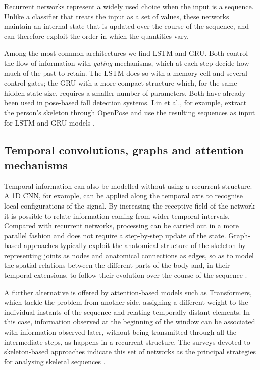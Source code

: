 Recurrent networks represent a widely used choice when the input is a sequence. Unlike a classifier that treats the input as a set of values, these networks maintain an internal state that is updated over the course of the sequence, and can therefore exploit the order in which the quantities vary.

Among the most common architectures we find LSTM and GRU. Both control the flow of information with \emph{gating} mechanisms, which at each step decide how much of the past to retain. The LSTM does so with a memory cell and several control gates; the GRU with a more compact structure which, for the same hidden state size, requires a smaller number of parameters. Both have already been used in pose-based fall detection systems. Lin et al., for example, extract the person's skeleton through OpenPose and use the resulting sequences as input for LSTM and GRU models \cite{LN}.

\subsection{Temporal convolutions, graphs and attention mechanisms}

Temporal information can also be modelled without using a recurrent structure. A 1D CNN, for example, can be applied along the temporal axis to recognise local configurations of the signal. By increasing the receptive field of the network it is possible to relate information coming from wider temporal intervals. Compared with recurrent networks, processing can be carried out in a more parallel fashion and does not require a step-by-step update of the state.
Graph-based approaches typically exploit the anatomical structure of the skeleton by representing joints as nodes and anatomical connections as edges, so as to model the spatial relations between the different parts of the body and, in their temporal extensions, to follow their evolution over the course of the sequence \cite{HO}. 

A further alternative is offered by attention-based models such as Transformers, which tackle the problem from another side, assigning a different weight to the individual instants of the sequence and relating temporally distant elements. In this case, information observed at the beginning of the window can be associated with information observed later, without being transmitted through all the intermediate steps, as happens in a recurrent structure.
The surveys devoted to skeleton-based approaches indicate this set of networks as the principal strategies for analysing skeletal sequences \cite{HO}.

